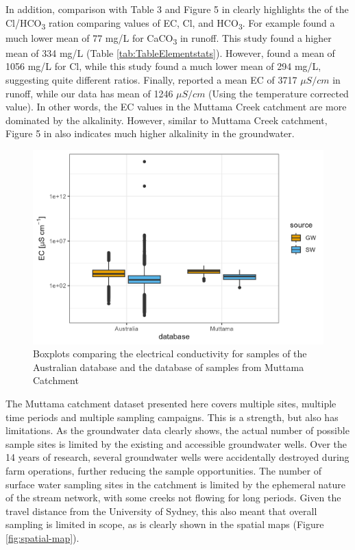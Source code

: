 \documentclass[, manuscript]{copernicus}
\begin{document}
In addition, comparison with Table 3 and Figure 5 in \citet{Hughes2007}
clearly highlights the of the Cl/HCO\textsubscript{3} ration comparing
values of EC, Cl, and HCO\textsubscript{3}. For example
\citet{Hughes2007} found a much lower mean of 77 mg/L for
CaCO\textsubscript{3} in runoff. This study found a higher mean of 334
mg/L (Table \ref{tab:TableElementstats}). However, \citet{Hughes2007}
found a mean of 1056 mg/L for Cl, while this study found a much lower
mean of 294 mg/L, suggesting quite different ratios. Finally,
\citet{Hughes2007} reported a mean EC of 3717 \(\mu S/cm\) in runoff,
while our data has mean of 1246 \(\mu S/cm\) (Using the temperature
corrected value). In other words, the EC values in the Muttama Creek
catchment are more dominated by the alkalinity. However, similar to
Muttama Creek catchment, Figure 5 in \citet{Hughes2007} also indicates
much higher alkalinity in the groundwater.

\begin{figure}
\includegraphics[width=0.8\linewidth]{Figures/globalboxplot} \caption{Boxplots comparing the electrical conductivity for samples of the Australian database and the database of samples from Muttama Catchment}\label{fig:global-plot}
\end{figure}

The Muttama catchment dataset presented here covers multiple sites,
multiple time periods and multiple sampling campaigns. This is a
strength, but also has limitations. As the groundwater data clearly
shows, the actual number of possible sample sites is limited by the
existing and accessible groundwater wells. Over the 14 years of
research, several groundwater wells were accidentally destroyed during
farm operations, further reducing the sample opportunities. The number
of surface water sampling sites in the catchment is limited by the
ephemeral nature of the stream network, with some creeks not flowing for
long periods. Given the travel distance from the University of Sydney,
this also meant that overall sampling is limited in scope, as is clearly
shown in the spatial maps (Figure \ref{fig:spatial-map}).
\end{document}
